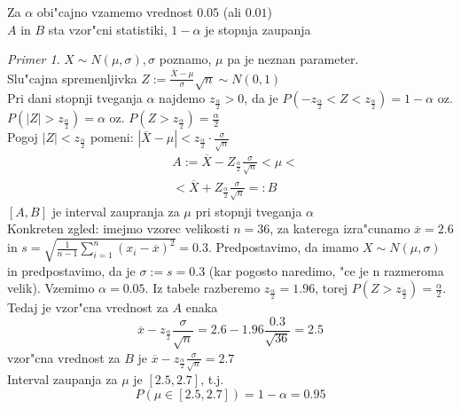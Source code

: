 \documentclass[a4paper,12pt]{article}
\theoremstyle{definition}
\theoremstyle{remark}
\newtheorem*{ex}{Primer}
\begin{document}
Za $\alpha$ obi"cajno vzamemo vrednost $0.05$ (ali $0.01$) \\
$A$ in $B$ sta vzor"cni statistiki, $1 - \alpha$ je stopnja zaupanja

\begin{ex}
    $X \sim N(\mu, \sigma), \sigma$ poznamo, $\mu$ pa je neznan parameter. \\
    Slu"cajna spremenljivka $Z := \frac{\overline{X} - \mu}{\sigma} \sqrt{n} \sim N(0,1)$ \\
    Pri dani stopnji tveganja $\alpha$ najdemo $z_{\frac{\alpha}{2}} > 0$, da je
    $P(-z_{\frac{\alpha}{2}} < Z < z_{\frac{\alpha}{2}}) = 1-\alpha$ oz.
    $P(|Z| > z_{\frac{\alpha}{2}}) = \alpha$ oz. $P(Z > z_{\frac{\alpha}{2}}) = \frac{\alpha}{2}$ \\
    Pogoj $|Z| < z_{\frac{\alpha}{2}}$ pomeni: $|\overline{X} - \mu| < z_{\frac{\alpha}{2}} \cdot
    \frac{\sigma}{\sqrt{n}}$ \\
    \begin{align*}
        &A := \overline{X} - Z_{\frac{\alpha}{2}} \frac{\sigma}{\sqrt{n}} < \mu <\\
        &< \overline{X} + Z_{\frac{\alpha}{2}} \frac{\sigma}{\sqrt{n}} =: B
    \end{align*}
    $[A,B]$ je interval zaupranja za $\mu$ pri stopnji tveganja $\alpha$ \\
    Konkreten zgled: imejmo vzorec velikosti $n=36$, za katerega izra"cunamo $\overline{x} = 2.6$ in
    $s = \sqrt{\frac{1}{n-1} \sum_{i=1}^{n} (x_i - \overline{x})^2} = 0.3$. Predpostavimo, da imamo
    $X \sim N(\mu, \sigma)$ in predpostavimo, da je $\sigma := s = 0.3$ (kar pogosto naredimo, "ce je
    n razmeroma velik). Vzemimo $\alpha = 0.05$. Iz tabele razberemo $z_{\frac{\alpha}{2}} = 1.96$, torej
    $P(Z > z_{\frac{\alpha}{2}}) = \frac{\alpha}{2}$. Tedaj je vzor"cna vrednost za $A$ enaka
    \begin{equation*}
        \overline{x} - z_{\frac{\alpha}{2}} \frac{\sigma}{\sqrt{n}} = 2.6 - 1.96 \frac{0.3}{\sqrt{36}} = 2.5
    \end{equation*}
    vzor"cna vrednost za $B$ je $\overline{x} - z_{\frac{\alpha}{2}} \frac{\sigma}{\sqrt{n}} = 2.7$ \\
    Interval zaupanja za $\mu$ je $[2.5, 2.7]$, t.j.
    \begin{equation*}
        P(\mu \in [2.5, 2.7]) = 1 - \alpha = 0.95
    \end{equation*}
\end{ex}
\end{document}
